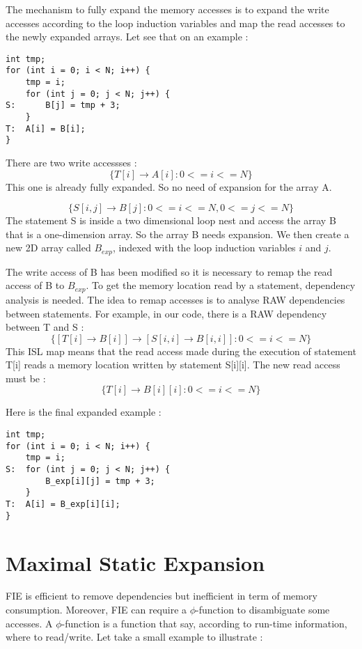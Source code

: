 The mechanism to fully expand the memory accesses is to expand the write accesses according to the loop induction variables and map the read accesses to the newly expanded arrays. Let see that on an example :

\begin{lstlisting}[frame=single]
int tmp;
for (int i = 0; i < N; i++) {
    tmp = i;
    for (int j = 0; j < N; j++) {
S:      B[j] = tmp + 3;
    }
T:  A[i] = B[i];
}
\end{lstlisting}

There are two write accessses :
\[
\{T[i] \rightarrow A[i]:0<=i<=N\}
\]
This one is already fully expanded. So no need of expansion for the array A.

\[
\{S[i,j] \rightarrow B[j]:0<=i<=N,0<=j<=N\}
\]
The statement S is inside a two dimensional loop nest and access the array B that is a one-dimension array. So the array B needs expansion. We then create a new 2D array called $B_{exp}$, indexed with the loop induction variables $i$ and $j$.

The write access of B has been modified so it is necessary to remap the read access of B to $B_{exp}$. To get the memory location read by a statement, dependency analysis is needed. The idea to remap accesses is to analyse \ac{RAW} dependencies between statements. For example, in our code, there is a \ac{RAW} dependency between T and S :
\[
\{[T[i] \rightarrow B[i]] \rightarrow [S[i,i] \rightarrow B[i,i]]:0<=i<=N\}
\]
This \ac{ISL} map means that the read access made during the execution of statement T[i] reads a memory location written by statement S[i][i]. The new read access must be :
 \[
\{T[i] \rightarrow B[i][i]:0<=i<=N\}
\]

Here is the final expanded example :
\begin{lstlisting}[frame=single]
int tmp;
for (int i = 0; i < N; i++) {
    tmp = i;
S:  for (int j = 0; j < N; j++) {
        B_exp[i][j] = tmp + 3;
    }
T:  A[i] = B_exp[i][i];
}
\end{lstlisting}


\section{Maximal Static Expansion}
\ac{FIE} is efficient to remove dependencies but inefficient in term of memory consumption. Moreover, \ac{FIE} can require a $\phi$-function to disambiguate some accesses. A $\phi$-function is a function that say, according to run-time information, where to read/write. Let take a small example to illustrate :

